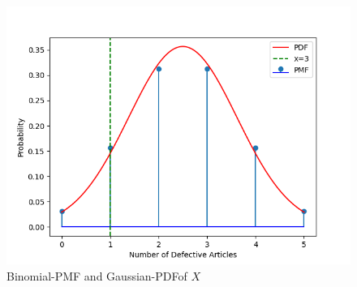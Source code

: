 \documentclass[journal,12pt,twocolumn]{IEEEtran}
\theoremstyle{remark}
\begin{document}
\begin{figure}
\centering
\includegraphics[width=\columnwidth]{ncert/9/3/23/figs/fig1.png}
\caption{ Binomial-PMF and Gaussian-PDFof $X$}
\end{figure}
\end{document}
